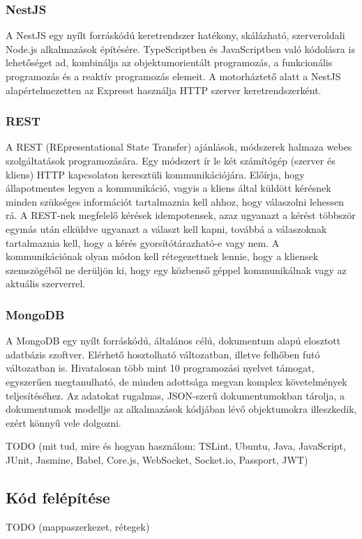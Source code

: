 \documentclass{elteikthesis}
\begin{document}
				\subsubsection{NestJS}
					A NestJS \cite{nestjs} egy nyílt forráskódú keretrendszer hatékony, skálázható, szerveroldali Node.js alkalmazások építésére. TypeScriptben és JavaScriptben való kódolásra is lehetőséget ad, kombinálja az objektumorientált programozás, a funkcionális programozás és a reaktív programozás elemeit. A motorháztető alatt a NestJS alapértelmezetten az Expresst használja HTTP szerver keretrendszerként.
				
				\subsubsection{REST}
					A REST (REpresentational State Transfer) \cite{rest} ajánlások, módszerek halmaza webes szolgáltatások programozására. Egy módszert ír le két számítógép (szerver és kliens) HTTP kapcsolaton keresztüli kommunikációjára. Előírja, hogy állapotmentes legyen a kommunikáció, vagyis a kliens által küldött kérésnek minden szükséges információt tartalmaznia kell ahhoz, hogy válaszolni lehessen rá. A REST-nek megfelelő kérések idempotensek, azaz ugyanazt a kérést többször egymás után elküldve ugyanazt a választ kell kapni, továbbá a válaszoknak tartalmaznia kell, hogy a kérés gyorsítótárazható-e vagy nem. A kommunikációnak olyan módon kell rétegezettnek lennie, hogy a kliensek szemszögéből ne derüljön ki, hogy egy közbenső géppel kommunikálnak vagy az aktuális szerverrel.
				
				\subsubsection{MongoDB}
					A MongoDB \cite{mongodb} egy nyílt forráskódú, általános célú, dokumentum alapú elosztott adatbázis szoftver. Elérhető hosztolható változatban, illetve felhőben futó változatban is. Hivatalosan több mint 10 programozási nyelvet támogat, egyszerűen megtanulható, de minden adottsága megvan komplex követelmények teljesítéséhez. Az adatokat rugalmas, JSON-szerű dokumentumokban tárolja, a dokumentumok modellje az alkalmazások kódjában lévő objektumokra illeszkedik, ezért könnyű vele dolgozni.

			TODO (mit tud, mire és hogyan használom: TSLint, Ubuntu, Java, JavaScript, JUnit, Jasmine, Babel, Core.js, WebSocket, Socket.io, Passport, JWT)
			
			\subsection{Kód felépítése}
			TODO (mappaszerkezet, rétegek)
		
\end{document}
